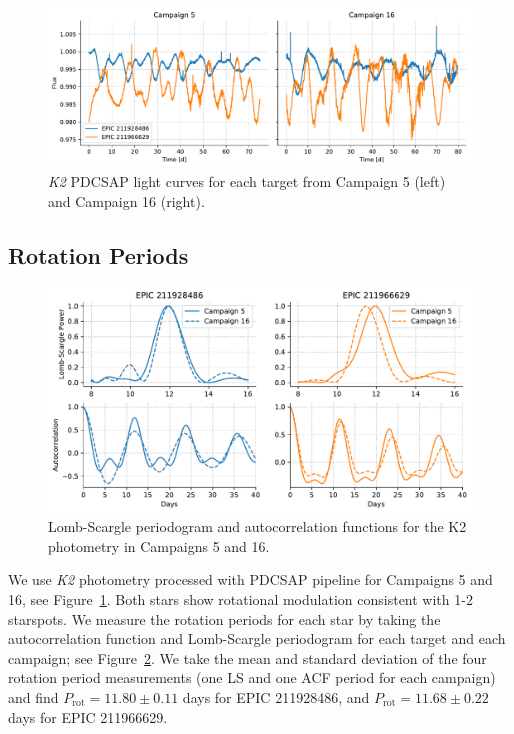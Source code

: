 

\begin{figure}
    \centering
    \includegraphics[scale=0.6]{nephelion/everest_lightcurve.pdf}
    \caption{{\it K2} PDCSAP light curves for each target from Campaign 5 (left) and Campaign 16 (right).}
    \label{fig:lightcurves}
\end{figure}

\subsection{Rotation Periods}


\begin{figure}
    \centering
    \includegraphics[scale=0.7]{nephelion/periodograms.pdf}
    \caption{Lomb-Scargle periodogram and autocorrelation functions for the K2 photometry in Campaigns 5 and 16.}
    \label{fig:periodograms}
\end{figure}

We use {\it K2} photometry processed with PDCSAP pipeline for Campaigns 5 and 16, see Figure~\ref{fig:lightcurves}. Both stars show rotational modulation consistent with 1-2 starspots. We measure the rotation periods for each star by taking the autocorrelation function and Lomb-Scargle periodogram for each target and each campaign; see Figure~\ref{fig:periodograms}. We take the mean and standard deviation of the four rotation period measurements (one LS and one ACF period for each campaign)  and find $P_\mathrm{rot} = 11.80 \pm 0.11$ days for EPIC 211928486, and $P_\mathrm{rot} = 11.68 \pm 0.22$ days for EPIC 211966629. 

